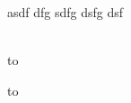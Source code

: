 \documentclass[a5paper,portrait]{scrreprt}
\newlength{\segmentwidth}
\newlength{\gaussheight}
\newenvironment{tubsbox}[3][tuWhite]{%
\newsavebox{\storebox}
\def\bgcolor{#1}
\begin{lrbox}{\storebox}
\begin{minipage}[t][#3\gaussheight]{#2\segmentwidth}
}{%
\end{minipage}
\end{lrbox}
\colorbox{\bgcolor}{%
\usebox{\storebox}
}
}
\begin{document}

\setlength{\fboxsep}{0cm}%
%
\colorbox{tuSecondaryLight}{%
  \begin{minipage}[t][\textheight]{\textwidth}%
      \LARGE asdf dfg sdfg dsfg dsf
  \end{minipage}%
}
\vspace*{-0.75\tulogoHeight}\vspace{-\textheight}\\%
\hspace*{-5.5mm}%
\colorbox{tuRed}{%
\hbox to %
}\vspace*{-0.25\tulogoHeight}\\%

\newpage


\newpage

\colorbox{tuSecondaryLight}{%
\parbox{\textwidth}{\vbox to }%
}
\end{document}
